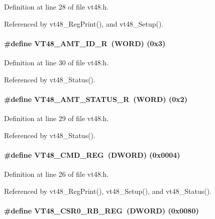 Definition at line 28 of file vt48.h.

Referenced by vt48\_\-RegPrint(), and vt48\_\-Setup().
\paragraph[{VT48\_\-AMT\_\-ID\_\-R}]{\setlength{\rightskip}{0pt plus 5cm}\#define VT48\_\-AMT\_\-ID\_\-R~({\bf WORD})  (0x3)}\hfill\label{vt48_8h_a5d0703990422d02cd5a89b12daca7d66}


Definition at line 30 of file vt48.h.

Referenced by vt48\_\-Status().
\paragraph[{VT48\_\-AMT\_\-STATUS\_\-R}]{\setlength{\rightskip}{0pt plus 5cm}\#define VT48\_\-AMT\_\-STATUS\_\-R~({\bf WORD})  (0x2)}\hfill\label{vt48_8h_a6405a9f528d5a53c8e753f392cd24220}


Definition at line 29 of file vt48.h.

Referenced by vt48\_\-Status().
\paragraph[{VT48\_\-CMD\_\-REG}]{\setlength{\rightskip}{0pt plus 5cm}\#define VT48\_\-CMD\_\-REG~({\bf DWORD}) (0x0004)}\hfill\label{vt48_8h_aaf55fbadf16d6f1882195204ee69a169}


Definition at line 26 of file vt48.h.

Referenced by vt48\_\-RegPrint(), vt48\_\-Setup(), and vt48\_\-Status().
\paragraph[{VT48\_\-CSR0\_\-RB\_\-REG}]{\setlength{\rightskip}{0pt plus 5cm}\#define VT48\_\-CSR0\_\-RB\_\-REG~({\bf DWORD}) (0x0080)}\hfill\label{vt48_8h_a71569e93778cef9e23524a7e60e773aa}


